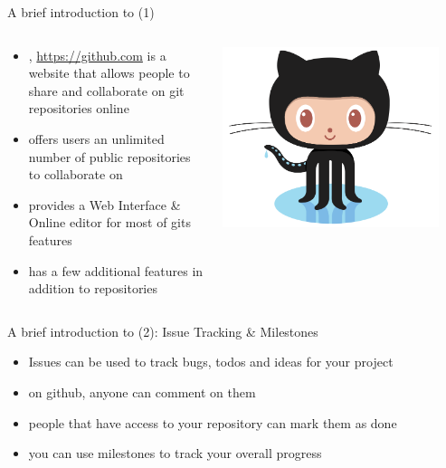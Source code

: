 \begin{frame}{A brief introduction to \github (1)}
  \begin{columns}[onlytextwidth]
    \begin{column}{0.7\textwidth}
      \begin{itemize}
        \item \github, \url{https://github.com} is a website that allows people to share and collaborate on git repositories online
        \item offers users an unlimited number of public repositories to collaborate on
        \item provides a Web Interface \& Online editor for most of gits features
        \item has a few additional features in addition to repositories
      \end{itemize}
    \end{column}
    \begin{column}{0.3\textwidth}
      \includegraphics[width=0.9\textwidth]{imgs/Octocat}
    \end{column}
  \end{columns}
\end{frame}


\begin{frame}{A brief introduction to \github (2): Issue Tracking \& Milestones}
  \begin{itemize}
    \item Issues can be used to track bugs, todos and ideas for your project
    \item on github, anyone can comment on them
    \item people that have access to your repository can mark them as done
    \item you can use milestones to track your overall progress
  \end{itemize}
\end{frame}


